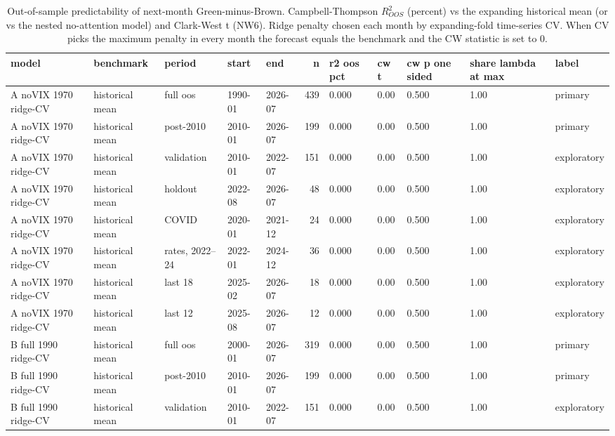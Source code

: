 \begin{table}[H]
\centering\small
\caption{Out-of-sample predictability of next-month Green-minus-Brown. Campbell-Thompson $R^2_{OOS}$ (percent) vs the expanding historical mean (or vs the nested no-attention model) and Clark-West t (NW6). Ridge penalty chosen each month by expanding-fold time-series CV. When CV picks the maximum penalty in every month the forecast equals the benchmark and the CW statistic is set to 0.}
\label{tab:m6_oos_primary}
\begin{adjustbox}{max width=\linewidth}
\begin{tabular}{lllllrlllll}
\toprule
model & benchmark & period & start & end & n & r2 oos pct & cw t & cw p one sided & share lambda at max & label \\
\midrule
A noVIX 1970 ridge-CV & historical mean & full oos & 1990-01 & 2026-07 & 439 & 0.000 & 0.00 & 0.500 & 1.00 & primary \\
A noVIX 1970 ridge-CV & historical mean & post-2010 & 2010-01 & 2026-07 & 199 & 0.000 & 0.00 & 0.500 & 1.00 & primary \\
A noVIX 1970 ridge-CV & historical mean & validation & 2010-01 & 2022-07 & 151 & 0.000 & 0.00 & 0.500 & 1.00 & exploratory \\
A noVIX 1970 ridge-CV & historical mean & holdout & 2022-08 & 2026-07 & 48 & 0.000 & 0.00 & 0.500 & 1.00 & exploratory \\
A noVIX 1970 ridge-CV & historical mean & COVID & 2020-01 & 2021-12 & 24 & 0.000 & 0.00 & 0.500 & 1.00 & exploratory \\
A noVIX 1970 ridge-CV & historical mean & rates, 2022--24 & 2022-01 & 2024-12 & 36 & 0.000 & 0.00 & 0.500 & 1.00 & exploratory \\
A noVIX 1970 ridge-CV & historical mean & last 18 & 2025-02 & 2026-07 & 18 & 0.000 & 0.00 & 0.500 & 1.00 & exploratory \\
A noVIX 1970 ridge-CV & historical mean & last 12 & 2025-08 & 2026-07 & 12 & 0.000 & 0.00 & 0.500 & 1.00 & exploratory \\
B full 1990 ridge-CV & historical mean & full oos & 2000-01 & 2026-07 & 319 & 0.000 & 0.00 & 0.500 & 1.00 & primary \\
B full 1990 ridge-CV & historical mean & post-2010 & 2010-01 & 2026-07 & 199 & 0.000 & 0.00 & 0.500 & 1.00 & primary \\
B full 1990 ridge-CV & historical mean & validation & 2010-01 & 2022-07 & 151 & 0.000 & 0.00 & 0.500 & 1.00 & exploratory \\

\end{tabular}
\end{adjustbox}
\end{table}
